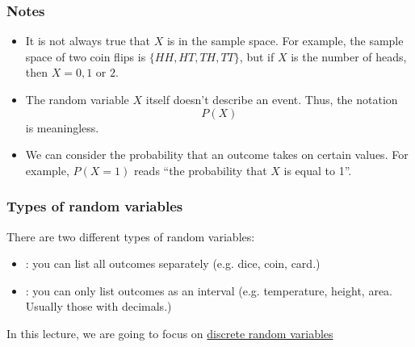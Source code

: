 \begin{frame}
\frametitle{Notes}
\begin{remark}{}
\begin{itemize}
\item It is not always true that $X$ is in the sample space. For example, the sample space of two coin flips is $\{HH, HT, TH, TT\}$, but if $X$ is the number of heads, then $X=0,1$ or $2$.
\item The random variable $X$ itself doesn't describe an event. Thus, the notation
\[P(X)\]
is meaningless. 
\item We can consider the probability that an outcome takes on certain values. For example, $P(X=1)$ reads ``the probability that $X$ is equal to 1''.
\end{itemize}
\end{remark}
\end{frame}


\begin{frame}
\frametitle{Types of random variables}
There are two different types of random variables: \pa
\begin{defn}{}{}
\begin{itemize}
\item {}: you can list all outcomes separately (e.g. dice, coin, card.) \pa
\item {}: you can only list outcomes as an interval (e.g. temperature, height, area. Usually those with decimals.) \pa
\end{itemize}
\end{defn}
In this lecture, we are going to focus on \underline{discrete random variables} \pa
\end{frame}

